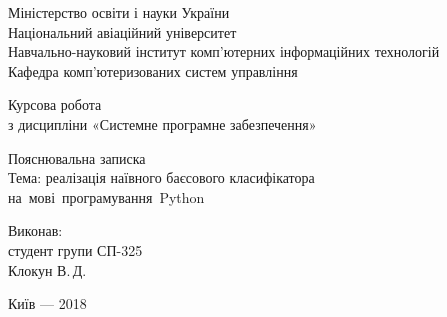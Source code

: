 \documentclass[
	a4paper,
	oneside,
	DIV = 12,
	fontsize = 13pt,
	headings = normal,
	numbers = endperiod,
]{scrartcl}
\theoremstyle{mythm}
\begin{document}
\begin{titlepage}
		\begin{center}
			Міністерство освіти і науки України\\
			Національний авіаційний університет\\
			Навчально-науковий інститут комп'ютерних інформаційних технологій\\
			Кафедра комп'ютеризованих систем управління

			\vspace{\fill}
				Курсова робота\\
				з дисципліни «Системне програмне забезпечення»\\

				\vspace*{3\baselineskip}

				Пояснювальна записка\\
				Тема: реалізація наївного баєсового класифікатора на~мові~програмування~\textenglish{Python}

			\vspace{\fill}

			\begin{flushright}
				Виконав:\\
				студент групи СП-325\\
				Клокун В.\,Д.\\
			\end{flushright}

			Київ — 2018
		\end{center}
	\end{titlepage}
\end{document}
